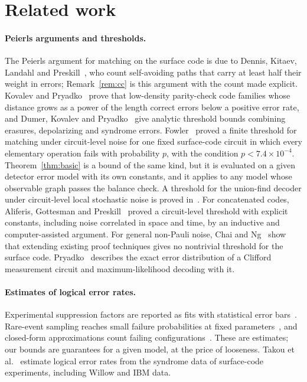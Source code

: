 \documentclass[11pt]{article}
\theoremstyle{plain}
\theoremstyle{definition}
\theoremstyle{remark}
\renewcommand{\_}{\oldunderscore\allowbreak}
\begin{document}
\section{Related work}\label{sec:related}

\paragraph{Peierls arguments and thresholds.} The Peierls argument for matching on the surface code is due to Dennis, Kitaev, Landahl and Preskill~\cite{DKLP}, who count self-avoiding paths that carry at least half their weight in errors; Remark~\ref{rem:cc} is this argument with the count made explicit. Kovalev and Pryadko~\cite{KovalevPryadko} prove that low-density parity-check code families whose distance grows as a power of the length correct errors below a positive error rate, and Dumer, Kovalev and Pryadko~\cite{DKP} give analytic threshold bounds combining erasures, depolarizing and syndrome errors. Fowler~\cite{Fowler} proved a finite threshold for matching under circuit-level noise for one fixed surface-code circuit in which every elementary operation fails with probability $p$, with the condition $p<7.4\times10^{-4}$. Theorem~\ref{thm:basic} is a bound of the same kind, but it is evaluated on a given detector error model with its own constants, and it applies to any model whose observable graph passes the balance check. A threshold for the union-find decoder under circuit-level local stochastic noise is proved in~\cite{YLY}. For concatenated codes, Aliferis, Gottesman and Preskill~\cite{AGP} proved a circuit-level threshold with explicit constants, including noise correlated in space and time, by an inductive and computer-assisted argument. For general non-Pauli noise, Chai and Ng~\cite{ChaiNg} show that extending existing proof techniques gives no nontrivial threshold for the surface code. Pryadko~\cite{Pryadko} describes the exact error distribution of a Clifford measurement circuit and maximum-likelihood decoding with it.

\paragraph{Estimates of logical error rates.} Experimental suppression factors are reported as fits with statistical error bars~\cite{Google22,Google24}. Rare-event sampling reaches small failure probabilities at fixed parameters~\cite{BV,Mayer}, and closed-form approximations count failing configurations~\cite{Regev}. These are estimates; our bounds are guarantees for a given model, at the price of looseness. Takou et al.~\cite{Takou} estimate logical error rates from the syndrome data of surface-code experiments, including Willow and IBM data.
\end{document}
